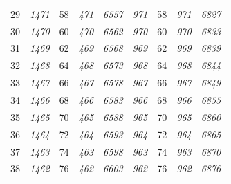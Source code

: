 \documentclass[10pt,fleqn]{article}
\begin{document}
\begin{longtable}{c|cccccccc}
29 & {\color{blue} \it 1471 \rm} & {\color{black} 58} & {\color{blue} \it 471 \rm} & {\color{blue} \it 6557 \rm} & {\color{blue} \it 971 \rm} & {\color{black} 58} & {\color{blue} \it 971 \rm} & {\color{blue} \it 6827 \rm} \\
30 & {\color{blue} \it 1470 \rm} & {\color{black} 60} & {\color{blue} \it 470 \rm} & {\color{blue} \it 6562 \rm} & {\color{blue} \it 970 \rm} & {\color{black} 60} & {\color{blue} \it 970 \rm} & {\color{blue} \it 6833 \rm} \\
31 & {\color{blue} \it 1469 \rm} & {\color{black} 62} & {\color{blue} \it 469 \rm} & {\color{blue} \it 6568 \rm} & {\color{blue} \it 969 \rm} & {\color{black} 62} & {\color{blue} \it 969 \rm} & {\color{blue} \it 6839 \rm} \\
32 & {\color{blue} \it 1468 \rm} & {\color{black} 64} & {\color{blue} \it 468 \rm} & {\color{blue} \it 6573 \rm} & {\color{blue} \it 968 \rm} & {\color{black} 64} & {\color{blue} \it 968 \rm} & {\color{blue} \it 6844 \rm} \\
33 & {\color{blue} \it 1467 \rm} & {\color{black} 66} & {\color{blue} \it 467 \rm} & {\color{blue} \it 6578 \rm} & {\color{blue} \it 967 \rm} & {\color{black} 66} & {\color{blue} \it 967 \rm} & {\color{blue} \it 6849 \rm} \\
34 & {\color{blue} \it 1466 \rm} & {\color{black} 68} & {\color{blue} \it 466 \rm} & {\color{blue} \it 6583 \rm} & {\color{blue} \it 966 \rm} & {\color{black} 68} & {\color{blue} \it 966 \rm} & {\color{blue} \it 6855 \rm} \\
35 & {\color{blue} \it 1465 \rm} & {\color{black} 70} & {\color{blue} \it 465 \rm} & {\color{blue} \it 6588 \rm} & {\color{blue} \it 965 \rm} & {\color{black} 70} & {\color{blue} \it 965 \rm} & {\color{blue} \it 6860 \rm} \\
36 & {\color{blue} \it 1464 \rm} & {\color{black} 72} & {\color{blue} \it 464 \rm} & {\color{blue} \it 6593 \rm} & {\color{blue} \it 964 \rm} & {\color{black} 72} & {\color{blue} \it 964 \rm} & {\color{blue} \it 6865 \rm} \\
37 & {\color{blue} \it 1463 \rm} & {\color{black} 74} & {\color{blue} \it 463 \rm} & {\color{blue} \it 6598 \rm} & {\color{blue} \it 963 \rm} & {\color{black} 74} & {\color{blue} \it 963 \rm} & {\color{blue} \it 6870 \rm} \\
38 & {\color{blue} \it 1462 \rm} & {\color{black} 76} & {\color{blue} \it 462 \rm} & {\color{blue} \it 6603 \rm} & {\color{blue} \it 962 \rm} & {\color{black} 76} & {\color{blue} \it 962 \rm} & {\color{blue} \it 6876 \rm} \\

\end{longtable}
\end{document}
